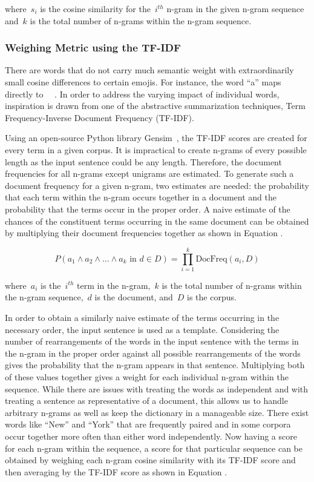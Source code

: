 \documentclass{article}[10]
\newcommand*{\img}[1]{%
  \raisebox{-.3\baselineskip}{%
    \texttt{[image: \#1]}%
  }%
}
\begin{document}
where~\(s_{i}\) is the cosine similarity for the~\(i^{th}\) n-gram in the given n-gram sequence and~\(k\) is the total number of n-grams within the n-gram sequence.

\subsubsection{Weighing Metric using the TF-IDF\label{sec:TF-IDFWeighing}}

There are words that do not carry much semantic weight with extraordinarily small cosine differences to certain emojis. For instance, the word ``a'' maps directly to~~\img{emojis/1f4af.png}. In order to address the varying impact of individual words, inspiration is drawn from one of the abstractive summarization techniques, Term Frequency-Inverse Document Frequency (TF-IDF).

Using an open-source Python library Gensim~\cite{gensim}, the TF-IDF scores are created for every term in a given corpus. It is impractical to create n-grams of every possible length as the input sentence could be any length. Therefore, the document frequencies for all n-grams except unigrams are estimated. To generate such a document frequency for a given n-gram, two estimates are needed: the probability that each term within the n-gram occurs together in a document and the probability that the terms occur in the proper order. A naive estimate of the chances of the constituent terms occurring in the same document can be obtained by multiplying their document frequencies together as shown in Equation .

\begin{equation}
  P(a_{1} \land a_{2} \land \ldots \land a_{k} \textrm{ in } d \in D) = \prod_{i=1}^{k}\textrm{DocFreq}(a_{i}, D) \label{eq:TF-IDFWeighing}
\end{equation}

where~\(a_{i}\) is the~\(i^{th}\) term in the n-gram,~\(k\) is the total number of n-grams within the n-gram sequence,~\(d\) is the document, and~\(D\) is the corpus.

In order to obtain a similarly naive estimate of the terms occurring in the necessary order, the input sentence is used as a template. Considering the number of rearrangements of the words in the input sentence with the terms in the n-gram in the proper order against all possible rearrangements of the words gives the probability that the n-gram appears in that sentence. Multiplying both of these values together gives a weight for each individual n-gram within the sequence. While there are issues with treating the words as independent and with treating a sentence as representative of a document, this allows us to handle arbitrary n-grams as well as keep the dictionary in a manageable size. There exist words like ``New'' and ``York'' that are frequently paired and in some corpora occur together more often than either word independently. Now having a score for each n-gram within the sequence, a score for that particular sequence can be obtained by weighing each n-gram cosine similarity with its TF-IDF score and then averaging by the TF-IDF score as shown in Equation .
\end{document}
